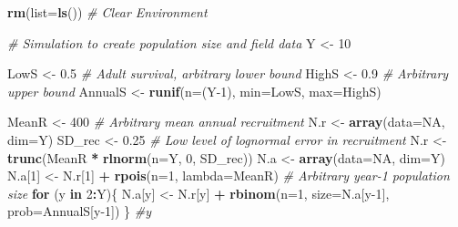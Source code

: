 \documentclass[
]{krantz}
\makeatletter
\newenvironment{Shaded}{\begin{snugshade}}{\end{snugshade}}
\newcommand{\AttributeTok}[1]{\textcolor[rgb]{0.27,0.27,0.27}{#1}}
\newcommand{\CommentTok}[1]{\textcolor[rgb]{0.37,0.37,0.37}{\textit{#1}}}
\newcommand{\ConstantTok}[1]{\textcolor[rgb]{0.37,0.37,0.37}{#1}}
\newcommand{\ControlFlowTok}[1]{\textcolor[rgb]{0.27,0.27,0.27}{\textbf{#1}}}
\newcommand{\DecValTok}[1]{\textcolor[rgb]{0.06,0.06,0.06}{#1}}
\newcommand{\FloatTok}[1]{\textcolor[rgb]{0.06,0.06,0.06}{#1}}
\newcommand{\FunctionTok}[1]{\textcolor[rgb]{0.27,0.27,0.27}{\textbf{#1}}}
\newcommand{\NormalTok}[1]{#1}
\newcommand{\OtherTok}[1]{\textcolor[rgb]{0.37,0.37,0.37}{#1}}
\newcommand{\SpecialCharTok}[1]{\textcolor[rgb]{0.43,0.43,0.43}{\textbf{#1}}}
\newenvironment{kframe}{%
\medskip{}
\setlength{\fboxsep}{.8em}
 \def\at@end@of@kframe{}%
 \ifinner\ifhmode%
  \def\at@end@of@kframe{\end{minipage}}%
  \begin{minipage}{\columnwidth}%
 \fi\fi%
 \def\FrameCommand##1{\hskip\@totalleftmargin \hskip-\fboxsep
 \colorbox{shadecolor}{##1}\hskip-\fboxsep
     \hskip-\linewidth \hskip-\@totalleftmargin \hskip\columnwidth}%
 \MakeFramed {\advance\hsize-\width
   \@totalleftmargin\z@ \linewidth\hsize
   \@setminipage}}%
 {\par\unskip\endMakeFramed%
 \at@end@of@kframe}
\renewenvironment{Shaded}{\begin{kframe}}{\end{kframe}}
\makeatother
\begin{document}
\begin{Shaded}
\begin{Highlighting}[]
\FunctionTok{rm}\NormalTok{(}\AttributeTok{list=}\FunctionTok{ls}\NormalTok{()) }\CommentTok{\# Clear Environment}

\CommentTok{\# Simulation to create population size and field data}
\NormalTok{Y }\OtherTok{\textless{}{-}} \DecValTok{10}

\NormalTok{LowS }\OtherTok{\textless{}{-}} \FloatTok{0.5} \CommentTok{\# Adult survival, arbitrary lower bound}
\NormalTok{HighS }\OtherTok{\textless{}{-}} \FloatTok{0.9} \CommentTok{\# Arbitrary upper bound}
\NormalTok{AnnualS }\OtherTok{\textless{}{-}} \FunctionTok{runif}\NormalTok{(}\AttributeTok{n=}\NormalTok{(Y}\DecValTok{{-}1}\NormalTok{), }\AttributeTok{min=}\NormalTok{LowS, }\AttributeTok{max=}\NormalTok{HighS)}

\NormalTok{MeanR }\OtherTok{\textless{}{-}} \DecValTok{400} \CommentTok{\# Arbitrary mean annual recruitment}
\NormalTok{N.r }\OtherTok{\textless{}{-}} \FunctionTok{array}\NormalTok{(}\AttributeTok{data=}\ConstantTok{NA}\NormalTok{, }\AttributeTok{dim=}\NormalTok{Y)}
\NormalTok{SD\_rec }\OtherTok{\textless{}{-}} \FloatTok{0.25} \CommentTok{\# Low level of lognormal error in recruitment}
\NormalTok{N.r }\OtherTok{\textless{}{-}} \FunctionTok{trunc}\NormalTok{(MeanR }\SpecialCharTok{*} \FunctionTok{rlnorm}\NormalTok{(}\AttributeTok{n=}\NormalTok{Y, }\DecValTok{0}\NormalTok{, SD\_rec))}
\NormalTok{N.a }\OtherTok{\textless{}{-}} \FunctionTok{array}\NormalTok{(}\AttributeTok{data=}\ConstantTok{NA}\NormalTok{, }\AttributeTok{dim=}\NormalTok{Y)}
\NormalTok{N.a[}\DecValTok{1}\NormalTok{] }\OtherTok{\textless{}{-}}\NormalTok{ N.r[}\DecValTok{1}\NormalTok{] }\SpecialCharTok{+} \FunctionTok{rpois}\NormalTok{(}\AttributeTok{n=}\DecValTok{1}\NormalTok{, }\AttributeTok{lambda=}\NormalTok{MeanR) }\CommentTok{\# Arbitrary year{-}1 population size}
\ControlFlowTok{for}\NormalTok{ (y }\ControlFlowTok{in} \DecValTok{2}\SpecialCharTok{:}\NormalTok{Y)\{}
\NormalTok{  N.a[y] }\OtherTok{\textless{}{-}}\NormalTok{ N.r[y] }\SpecialCharTok{+} \FunctionTok{rbinom}\NormalTok{(}\AttributeTok{n=}\DecValTok{1}\NormalTok{, }\AttributeTok{size=}\NormalTok{N.a[y}\DecValTok{{-}1}\NormalTok{], }\AttributeTok{prob=}\NormalTok{AnnualS[y}\DecValTok{{-}1}\NormalTok{])}
\NormalTok{\} }\CommentTok{\#y}


\end{Highlighting}
\end{Shaded}
\end{document}
